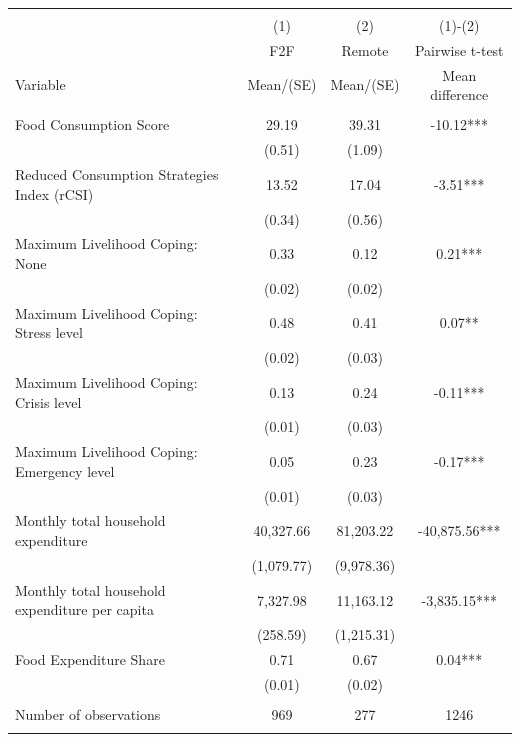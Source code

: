 
\begin{tabular}{@{\extracolsep{5pt}}lccc}
\\[-1.8ex]\hline \hline \\[-1.8ex]
 & \multicolumn{1}{c}{(1)}  & \multicolumn{1}{c}{(2)}  & \multicolumn{1}{c}{(1)-(2)} \\
 & \multicolumn{1}{c}{F2F}  & \multicolumn{1}{c}{Remote}  & \multicolumn{1}{c}{Pairwise t-test}  \\
Variable & Mean/(SE) & Mean/(SE) & Mean difference \\ \hline \\[-1.8ex] 
Food Consumption Score   & 29.19    & 39.31    & -10.12***   \\
 & (0.51)  & (1.09)  &  \\ [1ex]
Reduced Consumption Strategies Index (rCSI)   & 13.52    & 17.04    & -3.51***   \\
 & (0.34)  & (0.56)  &  \\ [1ex]
Maximum Livelihood Coping: None   & 0.33    & 0.12    & 0.21***   \\
 & (0.02)  & (0.02)  &  \\ [1ex]
Maximum Livelihood Coping: Stress level   & 0.48    & 0.41    & 0.07**   \\
 & (0.02)  & (0.03)  &  \\ [1ex]
Maximum Livelihood Coping: Crisis level   & 0.13    & 0.24    & -0.11***   \\
 & (0.01)  & (0.03)  &  \\ [1ex]
Maximum Livelihood Coping: Emergency level   & 0.05    & 0.23    & -0.17***   \\
 & (0.01)  & (0.03)  &  \\ [1ex]
Monthly total household expenditure   & 40,327.66    & 81,203.22    & -40,875.56***   \\
 & (1,079.77)  & (9,978.36)  &  \\ [1ex]
Monthly total household expenditure per capita   & 7,327.98    & 11,163.12    & -3,835.15***   \\
 & (258.59)  & (1,215.31)  &  \\ [1ex]
Food Expenditure Share   & 0.71    & 0.67    & 0.04***   \\
 & (0.01)  & (0.02)  &  \\ [1ex]
\hline \\[-1.8ex]
Number of observations  & 969   & 277  & 1246  \\
\hline \hline \\[-1.8ex]

\end{tabular}
